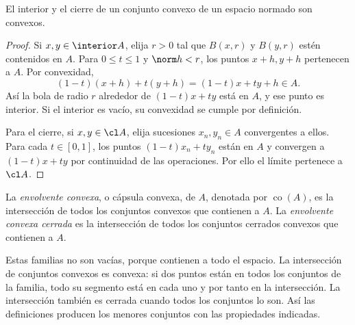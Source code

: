 \begin{proposicion}\label{ch24:interior-cierre}
El interior y el cierre de un conjunto convexo de un espacio normado son convexos.
\end{proposicion}
\begin{proof}
Si $x,y\in\interior A$, elija $r>0$ tal que $B(x,r)$ y $B(y,r)$ estén contenidos en $A$. Para $0\leq t\leq1$ y $\norm h<r$, los puntos $x+h,y+h$ pertenecen a $A$. Por convexidad,
\[
 (1-t)(x+h)+t(y+h)=(1-t)x+ty+h\in A.
\]
Así la bola de radio $r$ alrededor de $(1-t)x+ty$ está en $A$, y ese punto es interior. Si el interior es vacío, su convexidad se cumple por definición.

Para el cierre, si $x,y\in\cl A$, elija sucesiones $x_n,y_n\in A$ convergentes a ellos. Para cada $t\in[0,1]$, los puntos $(1-t)x_n+ty_n$ están en $A$ y convergen a $(1-t)x+ty$ por continuidad de las operaciones. Por ello el límite pertenece a $\cl A$.
\end{proof}

\begin{definicion}
La \emph{envolvente convexa}, o cápsula convexa, de $A$, denotada por $\operatorname{co}(A)$, es la intersección de todos los conjuntos convexos que contienen a $A$. La \emph{envolvente convexa cerrada} es la intersección de todos los conjuntos cerrados convexos que contienen a $A$.
\end{definicion}

Estas familias no son vacías, porque contienen a todo el espacio. La intersección de conjuntos convexos es convexa: si dos puntos están en todos los conjuntos de la familia, todo su segmento está en cada uno y por tanto en la intersección. La intersección también es cerrada cuando todos los conjuntos lo son. Así las definiciones producen los menores conjuntos con las propiedades indicadas.


